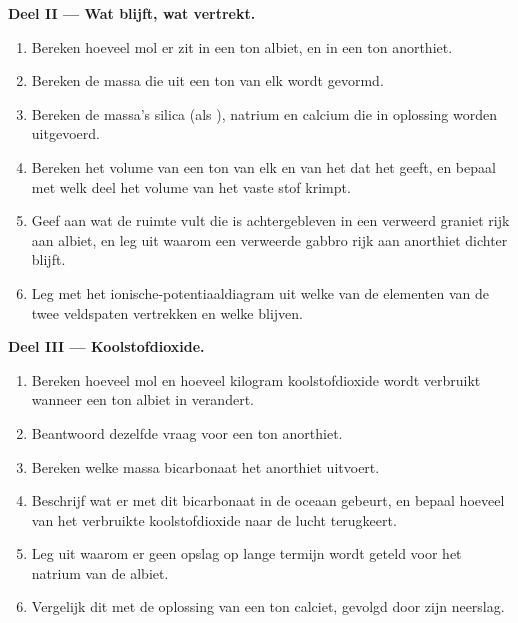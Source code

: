 \begin{problem}
\medskip
\noindent\textbf{Deel II --- Wat blijft, wat vertrekt.}
\begin{enumerate}[resume]
  \item Bereken hoeveel mol er zit in een ton albiet, en in een ton anorthiet.
  \item Bereken de massa  die uit een ton van elk wordt gevormd.
  \item Bereken de massa's silica (als ), natrium en calcium die in oplossing worden uitgevoerd.
  \item Bereken het volume van een ton van elk  en van het  dat het geeft, en bepaal met welk deel het volume van het vaste stof krimpt.
  \item Geef aan wat de ruimte vult die is achtergebleven in een verweerd graniet rijk aan albiet, en leg uit waarom een verweerde gabbro rijk aan anorthiet dichter blijft.
  \item Leg met het ionische-potentiaaldiagram uit welke van de elementen van de twee veldspaten vertrekken en welke blijven.
\end{enumerate}

\medskip
\noindent\textbf{Deel III --- Koolstofdioxide.}
\begin{enumerate}[resume]
  \item Bereken hoeveel mol en hoeveel kilogram koolstofdioxide wordt verbruikt wanneer een ton albiet in  verandert.
  \item Beantwoord dezelfde vraag voor een ton anorthiet.
  \item Bereken welke massa bicarbonaat het anorthiet uitvoert.
  \item Beschrijf wat er met dit bicarbonaat in de oceaan gebeurt, en bepaal hoeveel van het verbruikte koolstofdioxide naar de lucht terugkeert.
  \item Leg uit waarom er geen opslag op lange termijn wordt geteld voor het natrium van de albiet.
  \item Vergelijk dit met de oplossing van een ton calciet, gevolgd door zijn neerslag.
\end{enumerate}


\end{problem}
